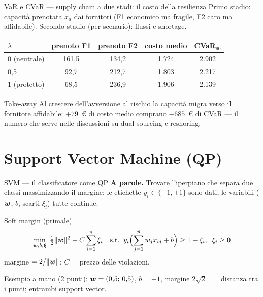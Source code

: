 \documentclass[11pt,aspectratio=169]{beamer}
\begin{document}
\begin{frame}{VaR e CVaR --- supply chain a due stadi: il costo della resilienza}
Primo stadio: capacità prenotata $x_a$ dai fornitori (F1 economico ma fragile,
F2 caro ma affidabile). Secondo stadio (per scenario): flussi e shortage.
\begin{center}\small
\begin{tabular}{lcccc}
\toprule
$\lambda$ & prenoto F1 & prenoto F2 & costo medio & CVaR$_{90}$ \\
\midrule
0 (neutrale) & 161,5 & 134,2 & 1.724 & 2.902 \\
0,5          &  92,7 & 212,7 & 1.803 & 2.217 \\
1 (protetto) &  68,5 & 236,9 & 1.906 & 2.139 \\
\bottomrule
\end{tabular}
\end{center}
\begin{block}{Take-away}
Al crescere dell'avversione al rischio la capacità migra verso il fornitore
affidabile: $+79$~\euro{} di costo medio comprano $-685$~\euro{} di CVaR ---
il numero che serve nelle discussioni su dual sourcing e reshoring.
\end{block}
\end{frame}

\section{Support Vector Machine (QP)}

\begin{frame}{SVM --- il classificatore come QP}
\textbf{A parole.} Trovare l'iperpiano che separa due classi massimizzando il
margine; le etichette $y_i \in \{-1, +1\}$ sono \alert{dati}, le variabili
($\boldsymbol{w}$, $b$, scarti $\xi_i$) tutte continue.
\begin{block}{Soft margin (primale)}
\vspace{-2ex}
\[
\min_{\boldsymbol{w}, b, \boldsymbol{\xi}}\; \tfrac12 \|\boldsymbol{w}\|^2 + C \sum_{i=1}^n \xi_i
\quad\text{s.t.}\;\;
y_i \Bigl( \sum_{j=1}^{p} w_j x_{ij} + b \Bigr) \ge 1 - \xi_i,\;\; \xi_i \ge 0
\]
margine $= 2/\|\boldsymbol{w}\|$; $C$ = prezzo delle violazioni.
\end{block}
Esempio a mano (2 punti): $\boldsymbol{w} = (0{,}5;\, 0{,}5)$, $b = -1$, margine
$2\sqrt2$ $=$ distanza tra i punti; entrambi support vector.
\end{frame}
\end{document}
